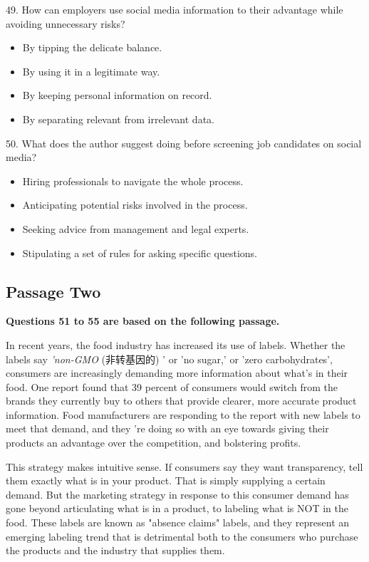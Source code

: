 \documentclass[UTF8,11pt]{ctexart}
\begin{document}
49. How can employers use social media information to their advantage while avoiding unnecessary risks?


\begin{itemize}[leftmargin=2em,itemsep=.2em,topsep=.4em]\item[A.] By tipping the delicate balance.
\item[B.] By using it in a legitimate way.
\item[C.] By keeping personal information on record.
\item[D.] By separating relevant from irrelevant data.
\end{itemize}

50. What does the author suggest doing before screening job candidates on social media?


\begin{itemize}[leftmargin=2em,itemsep=.2em,topsep=.4em]\item[A.] Hiring professionals to navigate the whole process.
\item[B.] Anticipating potential risks involved in the process.
\item[C.] Seeking advice from management and legal experts.
\item[D.] Stipulating a set of rules for asking specific questions.
\end{itemize}

\subsection*{\textbf{Passage Two}}


\textbf{Questions 51 to 55 are based on the following passage.}


In recent years, the food industry has increased its use of labels. Whether the labels say \textit{'non-GMO }(非转基因的) ' or 'no sugar,' or 'zero carbohydrates', consumers are increasingly demanding more information about what's in their food. One report found that 39 percent of consumers would switch from the brands they currently buy to others that provide clearer, more accurate product information. Food manufacturers are responding to the report with new labels to meet that demand, and they 're doing so with an eye towards giving their products an advantage over the competition, and bolstering profits.


This strategy makes intuitive sense. If consumers say they want transparency, tell them exactly what is in your product. That is simply supplying a certain demand. But the marketing strategy in response to this consumer demand has gone beyond articulating what is in a product, to labeling what is NOT in the food. These labels are known as "absence claims" labels, and they represent an emerging labeling trend that is detrimental both to the consumers who purchase the products and the industry that supplies them.
\end{document}
